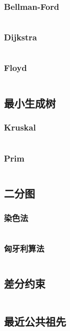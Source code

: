 \documentclass[a4paper,12pt]{article}
\begin{document}
\subsubsection{Bellman-Ford}
\inputminted[breaklines, linenos]{c++}{graph/shortest_path/bellman.cc}
\subsubsection{Dijkstra}
\inputminted[breaklines, linenos]{c++}{graph/shortest_path/dij.cc}
\subsubsection{Floyd}
\inputminted[breaklines, linenos]{c++}{graph/shortest_path/floyd.cc}
\subsection{最小生成树} %
\subsubsection{Kruskal} 
\inputminted[breaklines, linenos]{c++}{graph/mst/kruskal.cc}
\subsubsection{Prim} 
\inputminted[breaklines, linenos]{c++}{graph/mst/prim.cc}
\subsection{二分图} %
\subsubsection{染色法} 
\inputminted[breaklines, linenos]{c++}{graph/2graph/judge.cc}
\subsubsection{匈牙利算法} 
\inputminted[breaklines, linenos]{c++}{graph/2graph/xyl.cc}
\subsection{差分约束} %
\inputminted[breaklines, linenos]{c++}{graph/cfys/cfys.cc}
\subsection{最近公共祖先} %
\inputminted[breaklines, linenos]{c++}{graph/lca/lca.cc}
\end{document}
